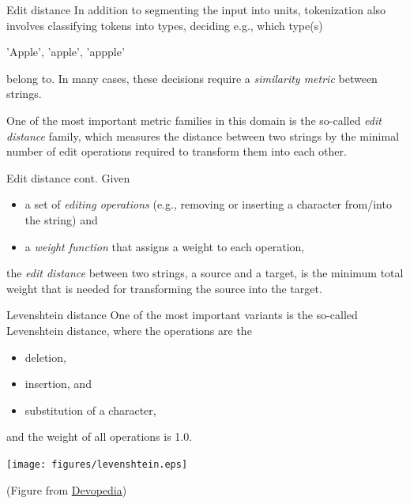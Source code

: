 \documentclass[style=upen, size=14pt]{powerdot}
\newcommand{\gold}{\color{arany}}
\theoremstyle{definition}
\begin{document}
\begin{slide}[toc=Edit distance]{Edit distance}
  In addition to segmenting the input into units, tokenization also involves
  classifying tokens into types, deciding e.g., which type(s)\smallskip
  \begin{center}
    'Apple', 'apple', 'appple'\smallskip
  \end{center}
  belong to. In many cases, these decisions require a \emph{similarity metric}
  between strings.

  One of the most important metric families in this domain is the so-called
  \emph{\gold edit distance} family, which measures the distance between two
  strings by the minimal number of edit operations required to transform them
  into each other.
\end{slide}

\begin{slide}[toc=]{Edit distance cont.}
  Given
  \begin{itemize}
  \item a set of \emph{\gold editing operations} (e.g., removing or inserting a character
    from/into the string) and
  \item a \emph{\gold weight function} that assigns a weight to each operation,
  \end{itemize}
  the \emph{\gold edit distance} between two strings, a source and a target, is
  the minimum total weight that is needed for transforming the source into the
  target.
\end{slide}
    
\begin{slide}[toc=]{Levenshtein distance}
  One of the most important variants is the so-called Levenshtein distance,
  where the operations are the
   \begin{itemize}
  \item deletion,
  \item insertion, and
  \item substitution of a character,
  \end{itemize}
  and the weight of all operations is 1.0.
  \begin{center}
    \texttt{[image: figures/levenshtein.eps]}\
    
    \footnotesize{(Figure from \href{https://devopedia.org/levenshtein-distance}{Devopedia})}
  \end{center}
\end{slide}
\end{document}
